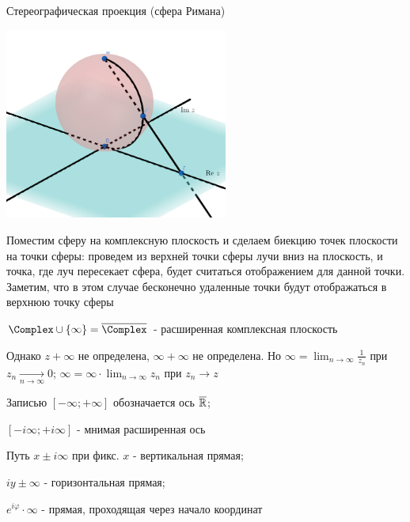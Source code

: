 \documentclass[12pt]{article}
\begin{document}
\Def Стереографическая проекция (сфера Римана)


\begin{center}
    \includegraphics[width=0.55\textwidth]{addchapters2/images/addchapters2_2025_02_07_5}
\end{center}

Поместим сферу на комплексную плоскость и сделаем биекцию точек плоскости на точки сферы: проведем из верхней точки сферы лучи вниз на плоскость, и точка, где луч пересекает сфера,
будет считаться отображением для данной точки. Заметим, что в этом случае бесконечно удаленные точки будут отображаться в верхнюю точку сферы

\Def $\Complex \cup \{\infty\} = \overline{\Complex}$ - расширенная комплексная плоскость

Однако $z + \infty$ не определена, $\infty + \infty$ не определена. 
Но $\infty = \lim_{n \to \infty} \frac{1}{z_n}$ при $z_n \underset{n \to \infty}{\longrightarrow} 0$; $\infty = \infty \cdot \lim_{n \to \infty} z_n$ при $z_n \longrightarrow z$

Записью $[-\infty; +\infty]$ обозначается ось $\overline{\mathbb{R}}$; 

\qquad\qquad $[-i\infty; +i\infty]$ - мнимая расширенная ось

Путь $x \pm i \infty$ при фикс. $x$ - вертикальная прямая; 

\qquad\qquad $iy \pm \infty$ - горизонтальная прямая; 

\qquad\qquad $e^{i\varphi} \cdot \infty$ - прямая, проходящая через начало координат




\end{document}

